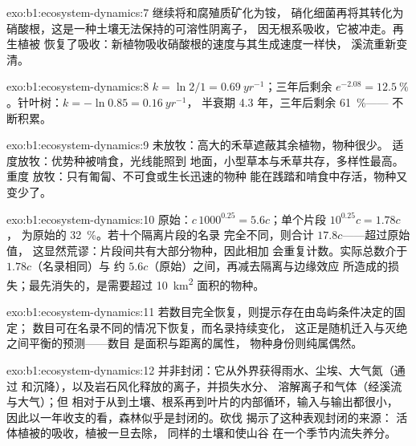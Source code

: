 \begin{solution}{exo:b1:ecosystem-dynamics:7}
继续将和腐殖质矿化为铵，
硝化细菌再将其转化为硝酸根，这是一种土壤无法保持的可溶性阴离子，
因无根系吸收，它被冲走。再生植被
恢复了吸收：新植物吸收硝酸根的速度与其生成速度一样快，
溪流重新变清。
\end{solution}

\begin{solution}{exo:b1:ecosystem-dynamics:8}
$k = \ln 2/1 = \qty{0.69}{yr^{-1}}$；三年后剩余 $e^{-2.08} =
\qty{12.5}{\%}$。针叶树：$k = -\ln 0.85 = \qty{0.16}{yr^{-1}}$，
半衰期 \num{4.3} 年，三年后剩余 \qty{61}{\%}——
不断积累。
\end{solution}

\begin{solution}{exo:b1:ecosystem-dynamics:9}
未放牧：高大的禾草遮蔽其余植物，物种很少。
适度放牧：优势种被啃食，光线能照到
地面，小型草本与禾草共存，多样性最高。重度
放牧：只有匍匐、不可食或生长迅速的物种
能在践踏和啃食中存活，物种又变少了。
\end{solution}

\begin{solution}{exo:b1:ecosystem-dynamics:10}
原始：$c\,1000^{0.25} = 5.6c$；单个片段 $10^{0.25}c = 1.78c$，
为原始的 \qty{32}{\%}。若十个隔离片段的名录
完全不同，则合计 $17.8c$——超过原始值，
这显然荒谬：片段间共有大部分物种，因此相加
会重复计数。实际总数介于 $1.78c$（名录相同）与
约 $5.6c$（原始）之间，再减去隔离与边缘效应
所造成的损失；最先消失的，是需要超过
\qty{10}{km^2} 面积的物种。
\end{solution}

\begin{solution}{exo:b1:ecosystem-dynamics:11}
若数目完全恢复，则提示存在由岛屿条件决定的固定；
数目可在名录不同的情况下恢复，而名录持续变化，
这正是随机迁入与灭绝之间平衡的预测——数目
是面积与距离的属性，
物种身份则纯属偶然。
\end{solution}

\begin{solution}{exo:b1:ecosystem-dynamics:12}
并非封闭：它从外界获得雨水、尘埃、大气氮（通过
和沉降），以及岩石风化释放的离子，并损失水分、
溶解离子和气体（经溪流与大气）；但
相对于从到土壤、根系再到叶片的内部循环，输入与输出都很小，
因此以一年收支的看，森林似乎是封闭的。砍伐
揭示了这种表观封闭的来源：
活体植被的吸收，植被一旦去除，
同样的土壤和使山谷
在一个季节内流失养分。
\end{solution}

